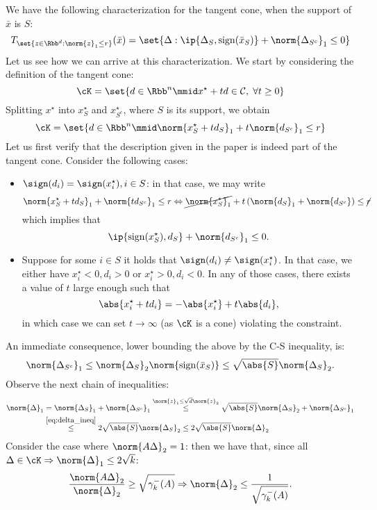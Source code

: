 \documentclass[a4paper]{article}
\newcommand{\xstar}{x^{\star}}
\begin{document}
We have the following characterization for the tangent cone, when the support of
$\bar{x}$ is $S$:
\[
    T_{\set{z \in \Rbb^d: \norm{z}_1 \leq r}}(\bar{x})
    = \set{\Delta: \ip{\Delta_S, \mathrm{sign}(\bar{x}_S)}
           + \norm{\Delta_{S^c}}_1 \leq 0}
\]
Let us see how we can arrive at this characterization. We start by considering
the definition of the tangent cone:
\[
    \cK = \set{d \in \Rbb^n \mmid \xstar + t d \in \mathcal{C}, \; \forall
    t \geq 0}
\]
Splitting $\xstar$ into $\xstar_S$ and $\xstar_{S^c}$, where $S$ is its support,
we obtain
\[
    \cK = \set{d \in \Rbb^n \mmid \norm{\xstar_S + t d_S}_1
        + t \norm{d_{S^c}}_1 \leq r}
\]
Let us first verify that the description given in the paper is indeed part of
the tangent cone. Consider the following cases:
\begin{itemize}
    \item $\sign(d_i) = \sign(\xstar_i), i \in S$: in that case, we may write
    \[
        \norm{\xstar_S + t d_S}_1 + \norm{t d_{S^c}}_1 \leq r \Leftrightarrow
        \cancel{\norm{\xstar_S}_1} + t \left( \norm{d_S}_1 + \norm{d_{S^c}}
        \right) \leq \cancel{r}
    \]
    which implies that
    \[
        \ip{\mathrm{sign}(\xstar_S), d_S} + \norm{d_{S^c}}_1 \leq 0.
    \]
    \item Suppose for some $i \in S$ it holds that $\sign(d_i)
    \neq \sign(\xstar_i)$. In that case, we either have $\xstar_i < 0, d_i > 0$
    or $\xstar_i > 0, d_i < 0$. In any of those cases, there exists a value of
    $t$ large enough such that
    \[
        \abs{\xstar_i + t d_i} = - \abs{\xstar_i} + t \abs{d_i},
    \]
    in which case we can set $t \to \infty$ (as $\cK$ is a cone) violating the
    constraint.
\end{itemize}
An immediate consequence, lower bounding the above by the C-S inequality, is:
\begin{equation}
    \norm{\Delta_{S^c}}_1 \leq \norm{\Delta_S}_2 \norm{\mathrm{sign}(\bar{x}_S)}
    \leq \sqrt{\abs{S}} \norm{\Delta_S}_2.
    \label{eq:delta_ineq}
\end{equation}
Observe the next chain of inequalities:
\begin{align*}
    \norm{\Delta}_1 &= \norm{\Delta_S}_1 + \norm{\Delta_{S^c}}_1
    \overset{\norm{z}_1 \leq \sqrt{d} \norm{z}_2}{\leq}
        \sqrt{\abs{S}} \norm{\Delta_S}_2 + \norm{\Delta_{S^c}}_1 \\
    &\overset{\eqref{eq:delta_ineq}}{\leq}
        2 \sqrt{\abs{S}} \norm{\Delta_S}_2 \leq 2 \sqrt{\abs{S}} \norm{\Delta}_2
\end{align*}
Consider the case where $\norm{A \Delta}_2 = 1$: then we have that, since all
$\Delta \in \cK \Rightarrow \norm{\Delta}_1 \leq 2 \sqrt{k}$:
\[
    \frac{\norm{A \Delta}_2}{\norm{\Delta}_2} \geq \sqrt{\gamma_k^-(A)}
    \Rightarrow \norm{\Delta}_2 \leq \frac{1}{\sqrt{\gamma_k^-(A)}}.
\]
\end{document}
